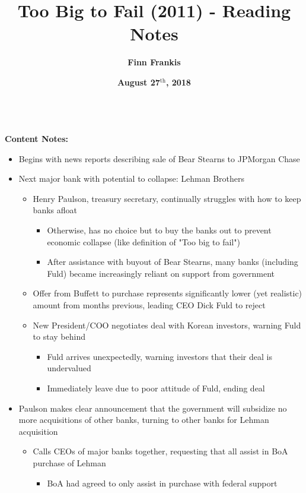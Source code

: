 \documentclass{article}
\title{\textbf{Too Big to Fail (2011) - Reading Notes}}
\date{\textbf{August 27$^\text{th}$, 2018}}
\author{\textbf{Finn Frankis}}
\begin{document}
    \maketitle
    \mbox{} \\ \textbf{Content Notes: }
    \begin{itemize}
        \item Begins with news reports describing sale of Bear Stearns to JPMorgan Chase
        \item Next major bank with potential to collapse: Lehman Brothers
        \begin{itemize}
            \item Henry Paulson, treasury secretary, continually struggles with how to keep banks afloat
            \begin{itemize}
                \item Otherwise, has no choice but to buy the banks out to prevent economic collapse (like definition of "Too big to fail")
                \item After assistance with buyout of Bear Stearns, many banks (including Fuld) became increasingly reliant on support from government
            \end{itemize}
            \item Offer from Buffett to purchase represents significantly lower (yet realistic) amount from months previous, leading CEO Dick Fuld to reject
            \item New President/COO negotiates deal with Korean investors, warning Fuld to stay behind
            \begin{itemize}
                \item Fuld arrives unexpectedly, warning investors that their deal is undervalued
                \item Immediately leave due to poor attitude of Fuld, ending deal
            \end{itemize}
        \end{itemize}
        \item Paulson makes clear announcement that the government will subsidize no more acquisitions of other banks, turning to other banks for Lehman acquisition
        \begin{itemize}
            \item Calls CEOs of major banks together, requesting that all assist in BoA purchase of Lehman 
            \begin{itemize}
                \item BoA had agreed to only assist in purchase with federal support 

\end{itemize}
\end{itemize}
\end{itemize}
\end{document}
